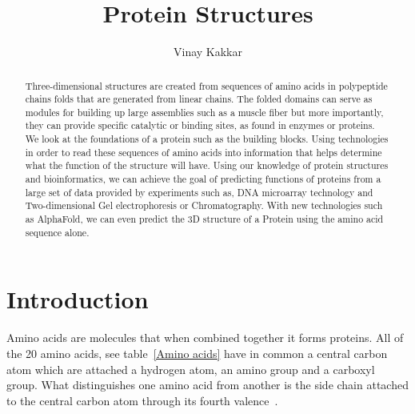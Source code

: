 \documentclass{report}
\title{Protein Structures}
\author{Vinay Kakkar}
\begin{document}
\maketitle

\tableofcontents

\begin{abstract}

Three-dimensional structures are created from sequences of amino acids in polypeptide chains folds that are generated from linear chains. The folded domains can serve as modules for building up large assemblies such as a muscle fiber but more importantly, they can provide specific catalytic or binding sites, as found in enzymes or proteins. We look at the foundations of a protein such as the building blocks. Using technologies in order to read these sequences of amino acids into information that helps determine what the function of the structure will have. Using our knowledge of protein structures and bioinformatics, we can achieve the goal of predicting functions of proteins from a large set of data provided by experiments such as, DNA microarray technology and Two-dimensional Gel electrophoresis or Chromatography. With new technologies such as AlphaFold, we can even predict the 3D structure of a Protein using the amino acid sequence alone.

\end{abstract}

\renewcommand\thesection{\arabic{section}}

\section{Introduction}
Amino acids are molecules that when combined together it forms proteins. All of the 20 amino acids, see table~\ref{Amino acids} have in common a central carbon atom which are attached a hydrogen atom, an amino group and a carboxyl group. What distinguishes one amino acid from another is the side chain attached to the central carbon atom through its fourth valence~\cite{branden_introduction_1998}.
\end{document}
